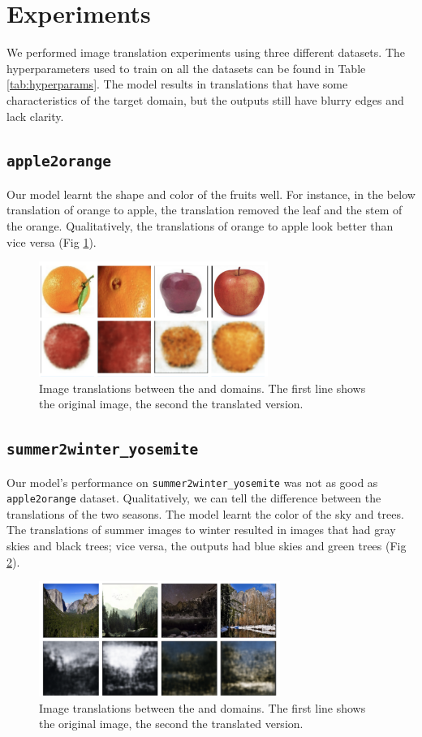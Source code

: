 \documentclass{article}
\begin{document}
\section{Experiments}
We performed image translation experiments using three different datasets. The hyperparameters used to train on all the datasets can be found in Table \ref{tab:hyperparams}. The model results in translations that have some characteristics of the target domain, but the outputs still have blurry edges and lack clarity.
\subsection{\texttt{apple2orange}}
Our model learnt the shape and color of the fruits well. For instance, in the below translation of orange to apple, the translation removed the leaf and the stem of the orange. Qualitatively, the translations of orange to apple look better than vice versa (Fig \ref{fig:apple2orange}).
\begin{figure}[H]
  \centering
  \includegraphics[height=3.75cm]{report/assets/apple2orange.png}
  \caption{Image translations between the  and  domains. The first line shows the original image, the second the translated version.}
  \label{fig:apple2orange}
\end{figure}
\subsection{\texttt{summer2winter\_yosemite}}
Our model's performance on \texttt{summer2winter\_yosemite} was not as good as \texttt{apple2orange} dataset. Qualitatively, we can tell the difference between the translations of the two seasons. The model learnt the color of the sky and trees. The translations of summer images to winter resulted in images that had gray skies and black trees; vice versa, the outputs had blue skies and green trees (Fig \ref{fig:summer2winter}).
\begin{figure}[H]
  \centering
  \includegraphics[height=3.75cm]{report/assets/summer2winter.png}
  \caption{Image translations between the  and  domains. The first line shows the original image, the second the translated version.}
  \label{fig:summer2winter}
\end{figure}
\end{document}
